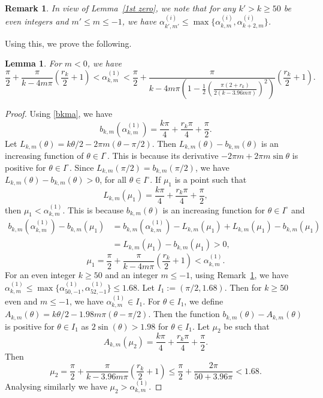 \documentclass[12pt,reqno]{amsart}
\newtheorem{lem}{Lemma}
\newtheorem{rmk}{Remark}
\newcommand{\lemref}[1]{Lemma~\ref{#1}}
\newcommand{\rmkref}[1]{Remark~\ref{#1}}
\begin{document}
\begin{rmk}\label{1st z}
In view of \lemref{1st zero}, we note that for any $k'>k\ge50$ be even integers 
and $m'\le m\le -1$, we have $\alpha_{k',m'}^{(i)}\le \max\{\alpha_{k,m}^{(i)},\alpha_{k+2,m}^{(i)}\}$.
\end{rmk}
Using this, we prove the following.
\begin{lem}\label{ulb}
For $m<0$, we have 
$$
\frac{\pi}{2}+\frac{\pi}{k-4m\pi}\left(\frac{r_k}{2}+1\right)<{\alpha}_{k,m}^{(1)}<\frac{\pi}{2}+\frac{\pi}{k-4m\pi\left(1-\frac{1}{2}\left(\frac{\pi(2+r_k)}{2(k-3.96m\pi)}\right)^2\right)}\left(\frac{r_k}{2}+1\right).
$$
\end{lem}
\begin{proof}
Using \eqref{bkma}, we have
\begin{equation}\label{bkm}
b_{k,m}({\alpha}_{k,m}^{(1)})=\frac{k\pi}{4}+\frac{r_k\pi}{4}+\frac{\pi}{2}.
\end{equation}
Let $L_{k,m}(\theta)={k\theta}/{2}-2\pi m\left(\theta-{\pi}/{2}\right)$. Then $L_{k,m}(\theta)-b_{k,m}(\theta)$ is an 
increasing function of $\theta\in I^{\circ}$. This is because its derivative $-2\pi m+2\pi m\sin\theta$ is positive for 
$\theta\in I^{\circ}$. Since $L_{k,m}(\pi/2)=b_{k,m}(\pi/2)$, we have $L_{k,m}(\theta)-b_{k,m}(\theta)>0$, for all $\theta\in I^{\circ}$.
If $\mu_1$ is a point such that 
$$
L_{k,m}(\mu_1)=\frac{k\pi}{4}+\frac{r_k\pi}{4}+\frac{\pi}{2},
$$
then $\mu_1 < {\alpha}_{k,m}^{(1)}$. This is because $b_{k,m}(\theta)$ is an increasing function for $\theta\in I^{\circ}$ and
\begin{align*}
    b_{k,m}({\alpha}_{k,m}^{(1)})-b_{k,m}(\mu_1)
&=b_{k,m}({\alpha}_{k,m}^{(1)})-L_{k,m}(\mu_1)+L_{k,m}(\mu_1)-b_{k,m}(\mu_1)\\
&=L_{k,m}(\mu_1)-b_{k,m}(\mu_1)>0,
\end{align*}
$$
\mu_1 = \frac{\pi}{2}+\frac{\pi}{k-4m\pi}\left(\frac{r_k}{2}+1\right)<{\alpha}_{k,m}^{(1)}.
$$
For an even integer $k\ge 50$ and an integer $m\le -1$, using \rmkref{1st z}, we have $\alpha_{k,m}^{(1)}\le \max\{\alpha_{50,-1}^{(1)},\alpha_{52,-1}^{(1)}\}
\le 1.68$. Let $I_1:=(\pi/2,1.68)$. Then for $k\ge 50$ even and $m\le-1$, we have $\alpha_{k,m}^{(1)}\in I_1$. For $\theta\in I_1$, we define $A_{k,m}(\theta)={k\theta}/{2}-1.98m\pi\left(\theta-{\pi}/{2}\right)$. Then the function 
$b_{k,m}(\theta)-A_{k,m}(\theta)$ is positive for $\theta\in I_1$ as $2\sin(\theta)>1.98$ for 
$\theta\in I_1$. Let $\mu_2$ be such that 
$$
A_{k,m}(\mu_2)=\frac{k\pi}{4}+\frac{r_k\pi}{4}+\frac{\pi}{2}.
$$
Then 
$$
\mu_2=\frac{\pi}{2}+\frac{\pi}{k-3.96m\pi}\left(\frac{r_k}{2}+1\right)\le \frac{\pi}{2}+\frac{2\pi}{50+3.96\pi}<1.68.
$$
Analysing similarly we have $\mu_2 > {\alpha}_{k,m}^{(1)}$. 


\end{proof}
\end{document}
